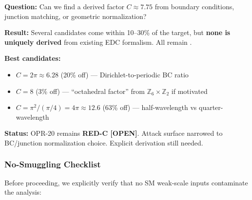 \begin{tcolorbox}[colback=blue!5, colframe=blue!60!black,
    title=\textbf{Executive Summary: Factor-8 Forensic Sweep}]
\textbf{Question:} Can we find a derived factor $C \approx 7.75$ from boundary
conditions, junction matching, or geometric normalization?

\textbf{Result:} Several candidates come within 10--30\% of the target, but
\textbf{none is uniquely derived} from existing EDC formalism. All remain \tagP{}.

\textbf{Best candidates:}
\begin{itemize}[nosep]
    \item $C = 2\pi \approx 6.28$ (20\% off) --- Dirichlet-to-periodic BC ratio
    \item $C = 8$ (3\% off) --- ``octahedral factor'' from $\mathbb{Z}_6 \times \mathbb{Z}_2$ if motivated
    \item $C = \pi^2/(\pi/4) = 4\pi \approx 12.6$ (63\% off) --- half-wavelength vs quarter-wavelength
\end{itemize}

\textbf{Status:} OPR-20 remains \textbf{RED-C [OPEN]}. Attack surface narrowed to
BC/junction normalization choice. Explicit derivation still needed.
\end{tcolorbox}

\subsubsection{No-Smuggling Checklist}
\label{sec:ch11_factor8_guardrails}

Before proceeding, we explicitly verify that no SM weak-scale inputs contaminate
the analysis:

